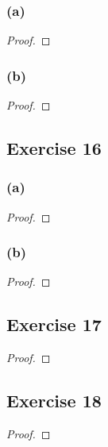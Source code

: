 \documentclass[14pt]{extarticle}
\begin{document}
\subsubsection{(a)}

\begin{proof}

\end{proof}

\subsubsection{(b)}

\begin{proof}

\end{proof}

\subsection{Exercise 16}

\subsubsection{(a)}

\begin{proof}

\end{proof}

\subsubsection{(b)}

\begin{proof}

\end{proof}

\subsection{Exercise 17}

\begin{proof}

\end{proof}

\subsection{Exercise 18}

\begin{proof}

\end{proof}
\end{document}
